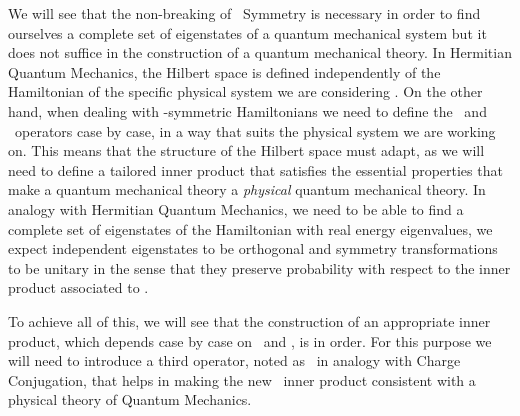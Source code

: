         We will see that the non-breaking of \PT\ Symmetry is necessary in order to find ourselves a complete set of eigenstates of a quantum mechanical system but it does not suffice in the construction of a quantum mechanical theory. In Hermitian Quantum Mechanics, the Hilbert space is defined independently of the Hamiltonian of the specific physical system we are considering \cite{bender2024}. On the other hand, when dealing with \PT-symmetric Hamiltonians we need to define the \hP\ and \hT\ operators case by case, in a way that suits the physical system we are working on. This means that the structure of the Hilbert space must adapt, as we will need to define a tailored inner product that satisfies the essential properties that make a quantum mechanical theory a \emph{physical} quantum mechanical theory. In analogy with Hermitian Quantum Mechanics, we need to be able to find a complete set of eigenstates of the Hamiltonian with real energy eigenvalues, we expect independent eigenstates to be orthogonal and symmetry transformations to be unitary in the sense that they preserve probability with respect to the inner product associated to \hPT.
        
        To achieve all of this, we will see that the construction of an appropriate inner product, which depends case by case on \hP\ and \hT, is in order. For this purpose we will need to introduce a third operator, noted as \hC\ in analogy with Charge Conjugation, that helps in making the new \CPT\ inner product consistent with a physical theory of Quantum Mechanics.

